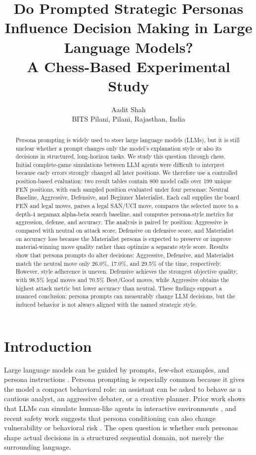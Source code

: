 \documentclass[10pt]{article}
\title{\textbf{Do Prompted Strategic Personas Influence Decision Making in Large Language Models?}\\
\large A Chess-Based Experimental Study}
\author{Aadit Shah\\BITS Pilani, Pilani, Rajasthan, India}
\date{}
\begin{document}
\maketitle

\begin{abstract}
Persona prompting is widely used to steer large language models (LLMs), but it is still unclear whether a prompt changes only the model's explanation style or also its decisions in structured, long-horizon tasks. We study this question through chess. Initial complete-game simulations between LLM agents were difficult to interpret because early errors strongly changed all later positions. We therefore use a controlled position-based evaluation: two result tables contain 800 model calls over 199 unique FEN positions, with each sampled position evaluated under four personas: Neutral Baseline, Aggressive, Defensive, and Beginner Materialist. Each call supplies the board FEN and legal moves, parses a legal SAN/UCI move, compares the selected move to a depth-4 negamax alpha-beta search baseline, and computes persona-style metrics for aggression, defense, and accuracy. The analysis is paired by position: Aggressive is compared with neutral on attack score, Defensive on defensive score, and Materialist on accuracy loss because the Materialist persona is expected to preserve or improve material-winning move quality rather than optimize a separate style score. Results show that persona prompts do alter decisions: Aggressive, Defensive, and Materialist match the neutral move only 26.0\%, 17.0\%, and 29.5\% of the time, respectively. However, style adherence is uneven. Defensive achieves the strongest objective quality, with 98.5\% legal moves and 70.5\% Best/Good moves, while Aggressive obtains the highest attack metric but lower accuracy than neutral. These findings support a nuanced conclusion: persona prompts can measurably change LLM decisions, but the induced behavior is not always aligned with the named strategic style.
\end{abstract}

\section{Introduction}

Large language models can be guided by prompts, few-shot examples, and persona instructions \citep{brown2020language,wei2022chain}. Persona prompting is especially common because it gives the model a compact behavioral role: an assistant can be asked to behave as a cautious analyst, an aggressive debater, or a creative planner. Prior work shows that LLMs can simulate human-like agents in interactive environments \citep{park2023generative}, and recent safety work suggests that persona conditioning can also change vulnerability or behavioral risk \citep{xu2025bullying,wang2025personality}. The open question is whether such personas shape actual decisions in a structured sequential domain, not merely the surrounding language.
\end{document}
